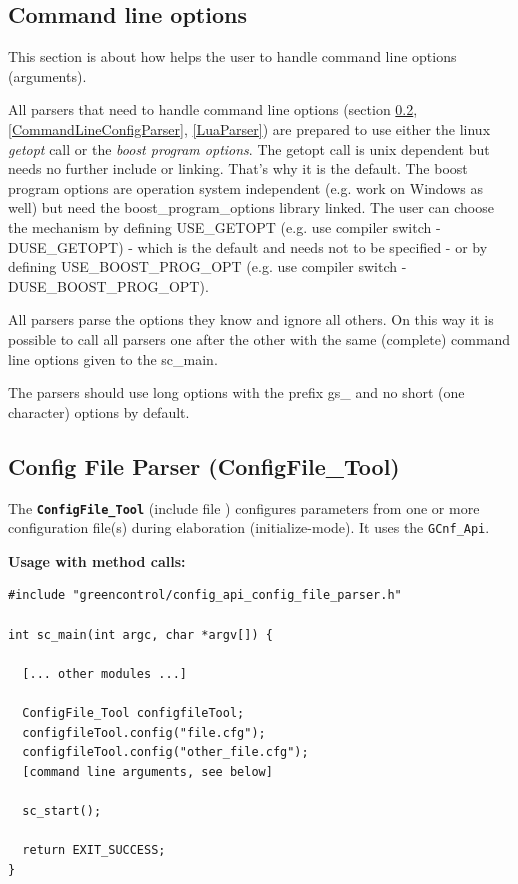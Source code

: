 \subsection{Command line options}
\label{CommandLineOptions}

This section is about how \GreenControl helps the user to handle command line options (arguments).

All parsers that need to handle command line options (section \ref{ConfigFileTool}, \ref{CommandLineConfigParser}, \ref{LuaParser}) are prepared to use either the linux \textsl{getopt} call or the \textsl{boost program options}. The getopt call is unix dependent but needs no further include or linking. That's why it is the default. The boost program options are operation system independent (e.g. work on Windows as well) but need the {\sffamily boost\_program\_options} library linked. The user can choose the mechanism by defining {\sffamily USE\_GETOPT} (e.g. use compiler switch -DUSE\_GETOPT) - which is the default and needs not to be specified - or by defining {\sffamily USE\_BOOST\_PROG\_OPT} (e.g. use compiler switch -DUSE\_BOOST\_PROG\_OPT).

All parsers parse the options they know and ignore all others. On this way it is possible to call all parsers one after the other with the same (complete) command line options given to the {\sffamily sc\_main}.

The parsers should use long options with the prefix {\sffamily gs\_} and no short (one character) options by default.


\subsection{Config File Parser (ConfigFile\_Tool)}
\label{ConfigFileTool}
The {\bf \lstinline|ConfigFile_Tool|} (include file ) configures parameters from one or more configuration file(s) during elaboration (initialize-mode). It uses the
\lstinline|GCnf_Api|.

\noindent
\begin{minipage}{\textwidth}
{\bf Usage with method calls:}

\begin{lstlisting}
#include "greencontrol/config_api_config_file_parser.h"

int sc_main(int argc, char *argv[]) {

  [... other modules ...]

  ConfigFile_Tool configfileTool;
  configfileTool.config("file.cfg");
  configfileTool.config("other_file.cfg");
  [command line arguments, see below]

  sc_start();

  return EXIT_SUCCESS;
}
\end{lstlisting}
\end{minipage}

